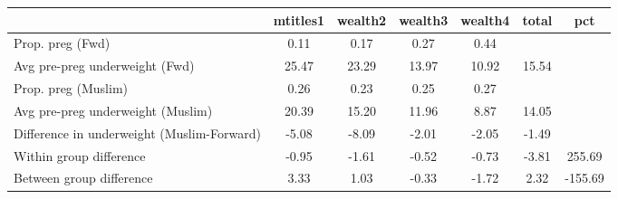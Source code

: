\begin{tabular}{l*{6}{c}}
\toprule
            &\multicolumn{1}{c}{mtitles1}&\multicolumn{1}{c}{wealth2}&\multicolumn{1}{c}{wealth3}&\multicolumn{1}{c}{wealth4}&\multicolumn{1}{c}{total}&\multicolumn{1}{c}{pct}\\
\midrule
\midrule
Prop. preg (Fwd)&        0.11&        0.17&        0.27&        0.44&            &            \\
Avg pre-preg underweight (Fwd)&       25.47&       23.29&       13.97&       10.92&       15.54&            \\
Prop. preg (Muslim)&        0.26&        0.23&        0.25&        0.27&            &            \\
Avg pre-preg underweight (Muslim)&       20.39&       15.20&       11.96&        8.87&       14.05&            \\
Difference in underweight (Muslim-Forward)&       -5.08&       -8.09&       -2.01&       -2.05&       -1.49&            \\
Within group difference&       -0.95&       -1.61&       -0.52&       -0.73&       -3.81&      255.69\\
Between group difference&        3.33&        1.03&       -0.33&       -1.72&        2.32&     -155.69\\
\bottomrule
\end{tabular}
